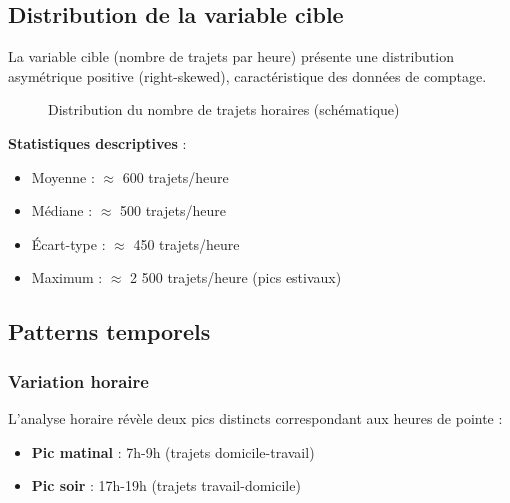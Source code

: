 \documentclass[12pt,a4paper]{article}
\begin{document}
\subsection{Distribution de la variable cible}

La variable cible (nombre de trajets par heure) présente une distribution asymétrique positive (right-skewed), caractéristique des données de comptage.

\begin{figure}[H]
\centering
{}
\caption{Distribution du nombre de trajets horaires (schématique)}
\label{fig:distribution}
\end{figure}

\textbf{Statistiques descriptives} :
\begin{itemize}
    \item Moyenne : $\approx$ 600 trajets/heure
    \item Médiane : $\approx$ 500 trajets/heure
    \item Écart-type : $\approx$ 450 trajets/heure
    \item Maximum : $\approx$ 2 500 trajets/heure (pics estivaux)
\end{itemize}

\subsection{Patterns temporels}

\subsubsection{Variation horaire}

L'analyse horaire révèle deux pics distincts correspondant aux heures de pointe :
\begin{itemize}
    \item \textbf{Pic matinal} : 7h-9h (trajets domicile-travail)
    \item \textbf{Pic soir} : 17h-19h (trajets travail-domicile)
\end{itemize}
\end{document}
